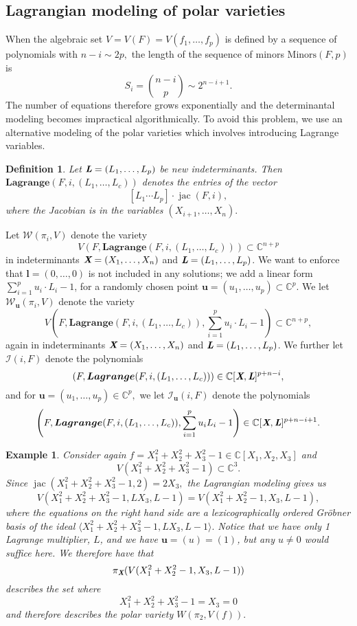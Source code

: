 \documentclass[a4paper]{article}
\def\sW{\mathscr{W}}
\def\sI{\mathscr{I}}
\def\Lb{\textit{\textbf{L}}}
\def\Xb{\textit{\textbf{X}}}
\def\ub{{\bm u}}
\def\lb{{\bm l}}
\DeclareMathOperator{\jac}{jac}
\def\minors{\textrm{Minors}(F,p)}
\def\C{\mathbb{C}}
\def\lagF{{\bm{Lagrange}}(F,i,(L_1,\hdots,L_c))}
\def\Iil{\mathscr{I}_{\ub}(i,F)}
\def\Wil{\mathscr{W}_{\ub}(\pi_i,V)}
\def\la{\langle}
\def\ra{\rangle}
\newtheorem{ex}[theorem]{Example}
\newtheorem{definition}[theorem]{Definition}
\begin{document}
\subsection{Lagrangian modeling of polar varieties} 
%
When the algebraic set $V=V(F)=V(f_1,\hdots,f_p)$ is defined by a sequence of polynomials with $n-i \sim 2p,$ the length of the sequence of minors $\minors$ is \[S_i = \binom{n-i}{p}\sim 2^{n-i+1}.\] 
The number of equations therefore grows exponentially and the determinantal modeling becomes impractical algorithmically. To avoid this problem, we use an alternative modeling of the polar varieties which involves introducing Lagrange variables. %
\begin{definition}
Let $\Lb = (L_1,\hdots,L_p)$ be new indeterminants. Then $\lagF$ denotes the entries of the vector
\[
[L_1\cdots L_p]\cdot \jac (F,i),
\] 
where the Jacobian is in the variables $(X_{i+1},\hdots,X_n).$
\end{definition}
%
\noindent 
Let $\sW(\pi_i,V)$ denote the variety
\[
V\left(F, \lagF\right) \subset \C^{n+p} 
\]
in indeterminants $\Xb=(X_1,\hdots,X_n)$ and $\Lb=(L_1,\hdots,L_p)$. We want to enforce that $\lb = (0,\hdots,0)$ is not included in any solutions; we add a linear form $\sum_{i=1}^pu_i\cdot L_i-1$, for a randomly chosen point $\ub = (u_1,\hdots,u_p) \subset \C^p.$ We let $\Wil$ denote the variety
\[
V\left(F, \lagF,\sum_{i=1}^pu_i\cdot L_i-1\right) \subset \C^{n+p},
\]
again in indeterminants $\Xb=(X_1,\hdots,X_n)$ and $\Lb=(L_1,\hdots,L_p)$. We further let $\sI(i,F)$
denote the polynomials 
\[
\left(F, \lagF \right) \in \C[\Xb,\Lb]^{p+n-i},
\]
and for $\ub = (u_1,\hdots,u_p) \in \C^p,$ we let $\Iil$ denote the polynomials
\[
\left(F, \lagF,\sum_{i=1}^pu_iL_i-1 \right)\in \C[\Xb,\Lb]^{p+n-i+1}.
\]
%
%
%
\begin{ex}
Consider again $f=X_1^2 + X_2^2 + X_3^2-1 \in \C[X_1,X_2,X_3]$ and 
\[V(X_1^2 + X_2^2 + X_3^2-1)\subset \C^3.\]
Since $\jac(X_1^2 + X_2^2 + X_3^2-1,2)=2X_3,$ the Lagrangian modeling gives us 
\[
 V(X_1^2 + X_2^2 + X_3^2-1, LX_3, L-1) = V(X_1^2 + X_2^2-1,X_3,L-1),
\]
where the equations on the right hand side are a lexicographically ordered Gr\"obner basis of the ideal $\la X_1^2 + X_2^2 + X_3^2-1, LX_3, L-1 \ra.$ 
Notice that we have only 1 Lagrange multiplier, $L$,  and we have $\ub=(u)=(1)$, but any $u \not = 0$ would suffice here. We therefore have that \[ \pi_{\Xb}(V(X_1^2 + X_2^2-1,X_3,L-1))\] describes the set where 
\[ X_1^2 + X_2^2 + X_3^2-1 = X_3 = 0\] and therefore describes the polar variety $W(\pi_2,V(f)).$
%
\end{ex}
\end{document}
